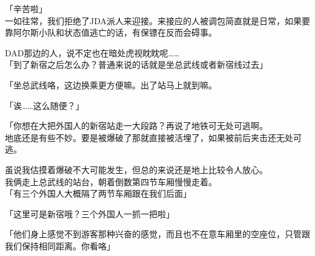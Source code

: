 「辛苦啦」\\

一如往常，我们拒绝了JDA派人来迎接。来接应的人被调包简直就是日常，如果要靠阿尔斯小队和状态值逃亡的话，有保镖在反而会碍事。

DAD那边的人，说不定也在暗处虎视眈眈呢……\\

「到了新宿之后怎么办？普通来说的话就是坐总武线或者新宿线过去」

「坐总武线咯，这边换乘更方便嘛。出了站马上就到嘛。

「诶……这么随便？」

「你想在大把外国人的新宿站走一大段路？再说了地铁可无处可逃啊。\\

地底还是有些不妙。要是被爆破了那就直接被活埋了，如果被前后夹击还无处可逃。

虽说我估摸着爆破不大可能发生，但总的来说还是地上比较令人放心。\\

我俩走上总武线的站台，朝着倒数第四节车厢慢慢走着。\\

「有三个外国人大概隔了两节车厢跟在我们后面」

「这里可是新宿哦？三个外国人一抓一把啦」

「他们身上感觉不到游客那种兴奋的感觉，而且也不在意车厢里的空座位，只管跟我们保持相同距离。你看咯」\\


